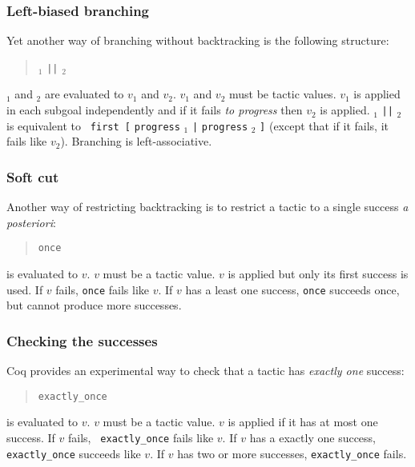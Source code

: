 \ErrMsg {}

\subsubsection[Left-biased branching]{Left-biased branching\tacindex{$\mid\mid$}
}

Yet another way of branching without backtracking is the following structure:
\begin{quote}
{\tacexpr}$_1$ {\tt ||} {\tacexpr}$_2$
\end{quote}
{\tacexpr}$_1$ and {\tacexpr}$_2$ are evaluated to $v_1$ and
$v_2$. $v_1$ and $v_2$ must be tactic values. $v_1$ is applied in each
subgoal independently and if it fails \emph{to progress} then $v_2$ is
applied. {\tacexpr}$_1$ {\tt ||} {\tacexpr}$_2$ is equivalent to {\tt
  first [} {\tt progress} {\tacexpr}$_1$ {\tt |} {\tt progress}
  {\tacexpr}$_2$ {\tt ]} (except that if it fails, it fails like
$v_2$). Branching is left-associative.

\subsubsection[Soft cut]{Soft cut}

Another way of restricting backtracking is to restrict a tactic to a
single success \emph{a posteriori}:
\begin{quote}
{\tt once} {\tacexpr}
\end{quote}
{\tacexpr} is evaluated to $v$. $v$ must be a tactic value. $v$ is
applied but only its first success is used. If $v$ fails, {\tt once}
{\tacexpr} fails like $v$. If $v$ has a least one success, {\tt once}
{\tacexpr} succeeds once, but cannot produce more successes.

\subsubsection[Checking the successes]{Checking the successes}

Coq provides an experimental way to check that a tactic has \emph{exactly one} success:
\begin{quote}
{\tt exactly\_once} {\tacexpr}
\end{quote}
{\tacexpr} is evaluated to $v$. $v$ must be a tactic value. $v$ is
applied if it has at most one success. If $v$ fails, {\tt
  exactly\_once} {\tacexpr} fails like $v$. If $v$ has a exactly one
success, {\tt exactly\_once} {\tacexpr} succeeds like $v$. If $v$ has
two or more successes, {\tt exactly\_once} {\tacexpr} fails.

